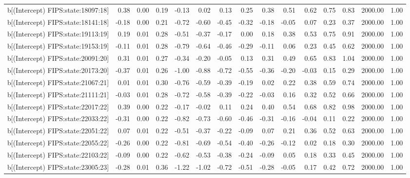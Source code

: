 \begin{table}[ht]
\begin{tabular}{rrrrrrrrrrrrrrr}
  b[(Intercept) FIPS:state:18097:18] & 0.38 & 0.00 & 0.19 & -0.13 & 0.02 & 0.13 & 0.25 & 0.38 & 0.51 & 0.62 & 0.75 & 0.83 & 2000.00 & 1.00 \\ 
  b[(Intercept) FIPS:state:18141:18] & -0.18 & 0.00 & 0.21 & -0.72 & -0.60 & -0.45 & -0.32 & -0.18 & -0.05 & 0.07 & 0.23 & 0.37 & 2000.00 & 1.00 \\ 
  b[(Intercept) FIPS:state:19113:19] & 0.19 & 0.01 & 0.28 & -0.51 & -0.37 & -0.17 & 0.00 & 0.18 & 0.38 & 0.53 & 0.75 & 0.91 & 2000.00 & 1.00 \\ 
  b[(Intercept) FIPS:state:19153:19] & -0.11 & 0.01 & 0.28 & -0.79 & -0.64 & -0.46 & -0.29 & -0.11 & 0.06 & 0.23 & 0.45 & 0.62 & 2000.00 & 1.00 \\ 
  b[(Intercept) FIPS:state:20091:20] & 0.31 & 0.01 & 0.27 & -0.34 & -0.20 & -0.05 & 0.13 & 0.31 & 0.49 & 0.65 & 0.83 & 1.04 & 2000.00 & 1.00 \\ 
  b[(Intercept) FIPS:state:20173:20] & -0.37 & 0.01 & 0.26 & -1.00 & -0.88 & -0.72 & -0.55 & -0.36 & -0.20 & -0.03 & 0.15 & 0.29 & 2000.00 & 1.00 \\ 
  b[(Intercept) FIPS:state:21067:21] & 0.01 & 0.01 & 0.30 & -0.76 & -0.59 & -0.39 & -0.19 & 0.02 & 0.22 & 0.38 & 0.59 & 0.74 & 2000.00 & 1.00 \\ 
  b[(Intercept) FIPS:state:21111:21] & -0.03 & 0.01 & 0.28 & -0.72 & -0.58 & -0.39 & -0.22 & -0.03 & 0.16 & 0.32 & 0.52 & 0.66 & 2000.00 & 1.00 \\ 
  b[(Intercept) FIPS:state:22017:22] & 0.39 & 0.00 & 0.22 & -0.17 & -0.02 & 0.11 & 0.24 & 0.40 & 0.54 & 0.68 & 0.82 & 0.98 & 2000.00 & 1.00 \\ 
  b[(Intercept) FIPS:state:22033:22] & -0.31 & 0.00 & 0.22 & -0.82 & -0.73 & -0.60 & -0.46 & -0.31 & -0.16 & -0.04 & 0.11 & 0.22 & 2000.00 & 1.00 \\ 
  b[(Intercept) FIPS:state:22051:22] & 0.07 & 0.01 & 0.22 & -0.51 & -0.37 & -0.22 & -0.09 & 0.07 & 0.21 & 0.36 & 0.52 & 0.63 & 2000.00 & 1.00 \\ 
  b[(Intercept) FIPS:state:22055:22] & -0.26 & 0.00 & 0.22 & -0.81 & -0.69 & -0.54 & -0.40 & -0.26 & -0.12 & 0.02 & 0.18 & 0.30 & 2000.00 & 1.00 \\ 
  b[(Intercept) FIPS:state:22103:22] & -0.09 & 0.00 & 0.22 & -0.62 & -0.53 & -0.38 & -0.24 & -0.09 & 0.05 & 0.18 & 0.33 & 0.45 & 2000.00 & 1.00 \\ 
  b[(Intercept) FIPS:state:23005:23] & -0.28 & 0.01 & 0.36 & -1.22 & -1.02 & -0.72 & -0.51 & -0.28 & -0.05 & 0.17 & 0.42 & 0.72 & 2000.00 & 1.00 \\ 

\end{tabular}
\end{table}
